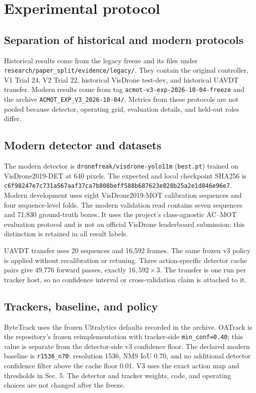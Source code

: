 \section{Experimental protocol}
\subsection{Separation of historical and modern protocols}
Historical results come from the legacy freeze and its files under \texttt{research/paper\_split/evidence/legacy/}. They contain the original controller, V1 Trial 24, V2 Trial 22, historical VisDrone test-dev, and historical UAVDT transfer. Modern results come from tag \texttt{acmot-v3-exp-2026-10-04-freeze} and the archive \texttt{ACMOT\_EXP\_V3\_2026-10-04/}. Metrics from these protocols are not pooled because detector, operating grid, evaluation details, and held-out roles differ.

\subsection{Modern detector and datasets}
The modern detector is \texttt{dronefreak/visdrone-yolo11m} (\texttt{best.pt}) trained on VisDrone2019-DET at 640 pixels. The expected and local checkpoint SHA256 is \texttt{c6f98247e7c731a567aaf37ca7b808beff588b687623e028b25a2e1d846e96e7}. Modern development uses eight VisDrone2019-MOT calibration sequences and four sequence-level folds. The modern validation read contains seven sequences and 71,830 ground-truth boxes. It uses the project's class-agnostic AC--MOT evaluation protocol and is not an official VisDrone leaderboard submission; this distinction is retained in all result labels.

UAVDT transfer uses 20 sequences and 16,592 frames. The same frozen v3 policy is applied without recalibration or retuning. Three action-specific detector cache pairs give 49,776 forward passes, exactly $16,592\times3$. The transfer is one run per tracker host, so no confidence interval or cross-validation claim is attached to it.

\subsection{Trackers, baseline, and policy}
ByteTrack uses the frozen Ultralytics defaults recorded in the archive. OATrack is the repository's frozen reimplementation with tracker-side \texttt{min\_conf=0.40}; this value is separate from the detector-side v3 confidence floor. The declared modern baseline is \texttt{r1536\_n70}: resolution 1536, NMS IoU 0.70, and no additional detector confidence filter above the cache floor 0.01. V3 uses the exact action map and thresholds in Sec. 5. The detector and tracker weights, code, and operating choices are not changed after the freeze.

